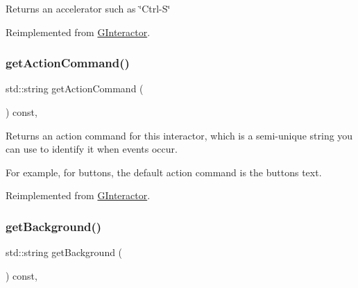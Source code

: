 \begin{DoxyReturn}{Returns}
an accelerator such as \char`\"{}\+Ctrl-\/\+S\char`\"{} 
\end{DoxyReturn}


Reimplemented from \mbox{\hyperlink{classsgl_1_1GInteractor_a69f8d23ed8f207fbecad99960776e942}{G\+Interactor}}.

\mbox{\label{classsgl_1_1GButton_a4f83505141da1f8446f0e0e0a9507930}} 
\subsubsection{\texorpdfstring{get\+Action\+Command()}{getActionCommand()}}
{\footnotesize\ttfamily std\+::string get\+Action\+Command (\begin{DoxyParamCaption}{ }\end{DoxyParamCaption}) const\hspace{0.3cm}{\ttfamily [override]}, {\ttfamily [virtual]}}



Returns an action command for this interactor, which is a semi-\/unique string you can use to identify it when events occur. 

For example, for buttons, the default action command is the button\textquotesingle{}s text. 

Reimplemented from \mbox{\hyperlink{classsgl_1_1GInteractor_a94eb4276000c4fdfb508ce9e6317a82a}{G\+Interactor}}.

\mbox{\label{classsgl_1_1GInteractor_a808e22cc1fdfbecf71ed8c64ef4600e0}} 
\subsubsection{\texorpdfstring{get\+Background()}{getBackground()}}
{\footnotesize\ttfamily std\+::string get\+Background (\begin{DoxyParamCaption}{ }\end{DoxyParamCaption}) const\hspace{0.3cm}{\ttfamily [virtual]}, {\ttfamily [inherited]}}



